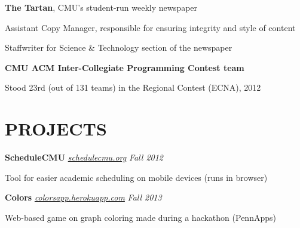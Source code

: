 \documentclass[margin, 11pt]{res} %
\begin{document}
\begin{resume}
\vspace{3pt}

{\bf The Tartan}, CMU's student-run weekly newspaper

\begin{itemize} \itemsep -2pt
{\small \item Assistant Copy Manager, responsible for ensuring integrity and style of content
\item Staffwriter for Science \& Technology section of the newspaper}
\end{itemize}

\vspace{3pt}

{\bf CMU ACM Inter-Collegiate Programming Contest team}
\begin{itemize} \itemsep -2pt
{\small \item Stood 23rd (out of 131 teams) in the Regional Contest (ECNA), 2012}
\end{itemize}

\section{PROJECTS}

{\bf ScheduleCMU} \href{www.schedulecmu.org}{\sl schedulecmu.org} \hfill {\sl Fall 2012}

\begin{itemize} \itemsep -2pt
{\small \item Tool for easier academic scheduling on mobile devices (runs in browser)}
\end{itemize}

\vspace{3pt}

{\bf Colors} \href{colorsapp.herokuapp.com}{\sl colorsapp.herokuapp.com} \hfill {\sl Fall 2013}
\begin{itemize} \itemsep -2pt
{\small \item Web-based game on graph coloring made during a hackathon (PennApps)}
\end{itemize}




\end{resume}
\end{document}
